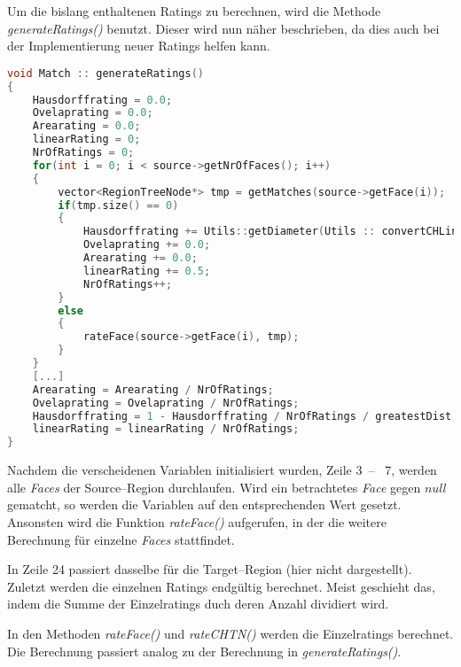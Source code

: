 Um die bislang enthaltenen Ratings zu berechnen, wird die Methode \textit{generateRatings()} benutzt. Dieser wird nun näher beschrieben, da dies auch bei der Implementierung neuer Ratings helfen kann.
\begin{lstlisting}[language=c++]
void Match :: generateRatings()
{
	Hausdorffrating = 0.0;
	Ovelaprating = 0.0;
	Arearating = 0.0;
	linearRating = 0;
	NrOfRatings = 0;
	for(int i = 0; i < source->getNrOfFaces(); i++)
	{    		
		vector<RegionTreeNode*> tmp = getMatches(source->getFace(i));
		if(tmp.size() == 0)
		{        
			Hausdorffrating += Utils::getDiameter(Utils :: convertCHLine2LineWA(source->getFace(i)->getCycle()->getLines()));
			Ovelaprating += 0.0;
			Arearating += 0.0;
			linearRating += 0.5;
			NrOfRatings++;
		}
		else
		{                        
			rateFace(source->getFace(i), tmp);            
		}         
	}
	[...]
	Arearating = Arearating / NrOfRatings;
	Ovelaprating = Ovelaprating / NrOfRatings;
	Hausdorffrating = 1 - Hausdorffrating / NrOfRatings / greatestDist;
	linearRating = linearRating / NrOfRatings;            
}	
\end{lstlisting}
Nachdem die verscheidenen Variablen initialisiert wurden, Zeile 3~--~ 7, werden alle \textit{Faces} der Source--Region durchlaufen. Wird ein betrachtetes \textit{Face} gegen $null$ gematcht, so werden die Variablen auf den entsprechenden Wert gesetzt. Ansonsten wird die Funktion \textit{rateFace()} aufgerufen, in der die weitere Berechnung für einzelne \textit{Faces} stattfindet. 

In Zeile 24 passiert dasselbe für die Target--Region (hier nicht dargestellt). Zuletzt werden die einzelnen Ratings endgültig berechnet. Meist geschieht das, indem die Summe der Einzelratings duch deren Anzahl dividiert wird. 

In den Methoden \textit{rateFace()} und \textit{rateCHTN()} werden die Einzelratings berechnet. Die Berechnung passiert analog zu der Berechnung in \textit{generateRatings()}.

